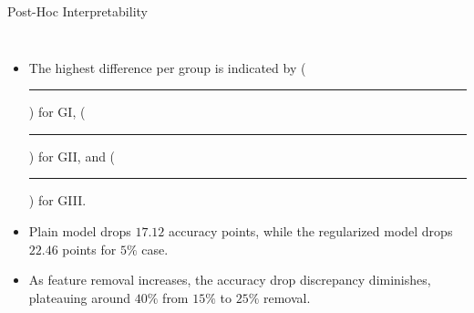 \documentclass[aspectratio=169]{beamer}
\DeclareRobustCommand{\legend}[1]{%
	\textcolor{#1}{\rule{1ex}{2ex}}%
}
\begin{document}
\begin{frame}{Post-Hoc Interpretability}
    \begin{columns}
                \begin{table}[h!]
                    \centering
                    \end{table}
        \begin{itemize}
            \item The highest difference per group is indicated by (\legend{GI!80}) for GI, (\legend{GII!80}) for GII, and (\legend{GIII!80}) for GIII.
            \item Plain model drops $17.12$ accuracy points, while the regularized model drops $22.46$ points for $5\%$ case.
            \item As feature removal increases, the accuracy drop discrepancy diminishes, plateauing around $40\%$ from $15\%$ to $25\%$ removal.
        \end{itemize}
    \end{columns}  
\end{frame}
\end{document}
